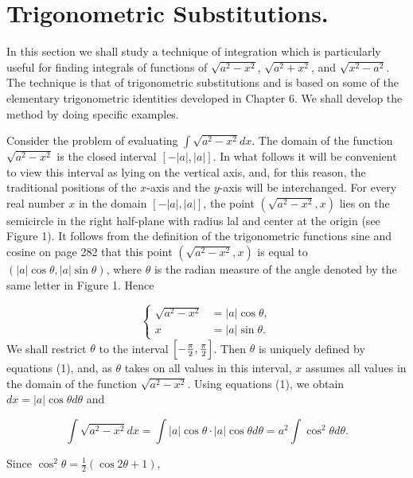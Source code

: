 \section{Trigonometric Substitutions.}
In this section we shall study a technique of integration which
is particularly useful for finding integrals of functions of $\sqrt{a^2 - x^2}$, $\sqrt{a^2 + x^2}$, and $\sqrt{x^2 - a^2}$. The technique is that of trigonometric substitutions and is based on some of the elementary trigonometric identities developed in Chapter 6. We shall develop the method by doing specific examples.


Consider the problem of evaluating $\int \sqrt{a^2 - x^2}dx$. The domain of the function $\sqrt{a^2 - x^2}$ is the closed interval $[-|a|, |a|]$. In what follows it will be convenient to view this interval as lying on the vertical axis, and, for this reason, the traditional positions of the $x$-axis and the $y$-axis will be interchanged. For every real number $x$ in the domain $[-|a|, |a|]$, the point $(\sqrt{a^2 - x^2}, x)$ lies on the semicircle in the right half-plane with radius lal and center at the origin (see Figure 1). It follows from the definition of the trigonometric functions sine and cosine on page 282 that this point $(\sqrt{a^2 - x^2}, x)$ is equal to $(|a| \cos \theta, |a| \sin \theta)$, where $\theta$ is the radian measure of the angle denoted by the same letter in Figure 1. Hence

\begin{equation}
\left \{
         \begin{array}{rl}
\sqrt{a^{2} - x^2} &= |a| \cos \theta,  \\
                       x  &= |a| \sin \theta. 
          \end{array}
\right.
\label{eq7.3.1}
\end{equation}
\noindent We shall restrict $\theta$ to the interval $\Bigl[-\frac{\pi}{2}, \frac{\pi}{2}\Bigr]$. Then $\theta$ is uniquely defined by equations (1), and, as $\theta$ takes on all values in this interval, $x$ assumes all values in the domain of the function $\sqrt{a^2 - x^2}$. Using equations (1), we obtain $dx = |a| \cos \theta d\theta$ and


$$
\int \sqrt{a^{2} - x^{2}} dx = \int |a| \cos \theta \cdot |a| \cos \theta d\theta 
= a^{2} \int \cos^{2}\theta d\theta.
$$

\noindent Since $\cos^{2} \theta = \frac{1}{2}(\cos 2 \theta + 1)$, 

